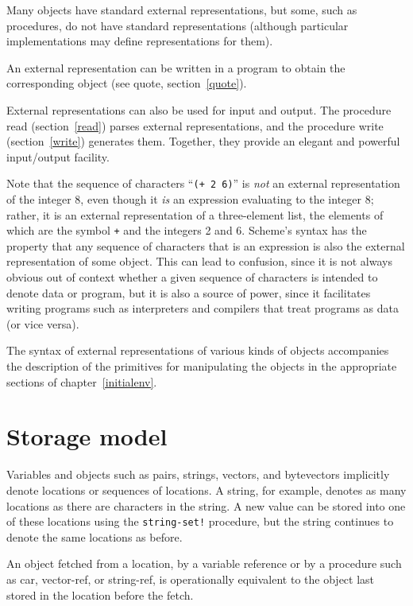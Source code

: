 Many objects have standard external representations, but some, such as
procedures, do not have standard representations (although particular
implementations may define representations for them).

An external representation can be written in a program to obtain the
corresponding object (see {\cf quote}, section~\ref{quote}).

External representations can also be used for input and output.  The
procedure {\cf read} (section~\ref{read}) parses external
representations, and the procedure {\cf write} (section~\ref{write})
generates them.  Together, they provide an elegant and powerful
input/output facility.

Note that the sequence of characters ``{\tt(+ 2 6)}'' is {\em not} an
external representation of the integer 8, even though it {\em is} an
expression evaluating to the integer 8; rather, it is an external
representation of a three-element list, the elements of which are the symbol
{\tt +} and the integers 2 and 6.  Scheme's syntax has the property that
any sequence of characters that is an expression is also the external
representation of some object.  This can lead to confusion, since it is not always
obvious out of context whether a given sequence of characters is
intended to denote data or program, but it is also a source of power,
since it facilitates writing programs such as interpreters and
compilers that treat programs as data (or vice versa).

The syntax of external representations of various kinds of objects
accompanies the description of the primitives for manipulating the
objects in the appropriate sections of chapter~\ref{initialenv}.

\section{Storage model}
\label{storagemodel}

Variables and objects such as pairs, strings, vectors, and bytevectors implicitly
denote locations or sequences of locations.  A string, for
example, denotes as many locations as there are characters in the string. 
A new value can be
stored into one of these locations using the {\tt string-set!} procedure, but
the string continues to denote the same locations as before.

An object fetched from a location, by a variable reference or by
a procedure such as {\cf car}, {\cf vector-ref}, or {\cf string-ref}, is
operationally equivalent
to the object last stored in the location before the fetch.

